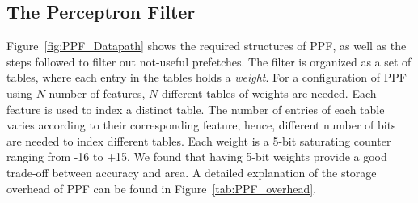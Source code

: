 \subsection{The Perceptron Filter}
\label{Arch-Perceptron}

Figure~\ref{fig:PPF_Datapath} shows the required structures of PPF, as well as
the steps followed to filter out not-useful prefetches. The filter is
organized as a set of tables, where each entry in the tables holds a
\textit{weight}. For a configuration of PPF using $N$ number of features, $N$
different tables of weights are needed. Each feature is used to index a
distinct table. The number of entries of each table varies according to their
corresponding feature, hence, different number of bits are needed to index
different tables. Each weight is a 5-bit saturating counter ranging from -16
to +15. We found that having 5-bit weights provide a good trade-off between
accuracy and area. A detailed explanation of the storage overhead of PPF can
be found in Figure~\ref{tab:PPF_overhead}.\\

